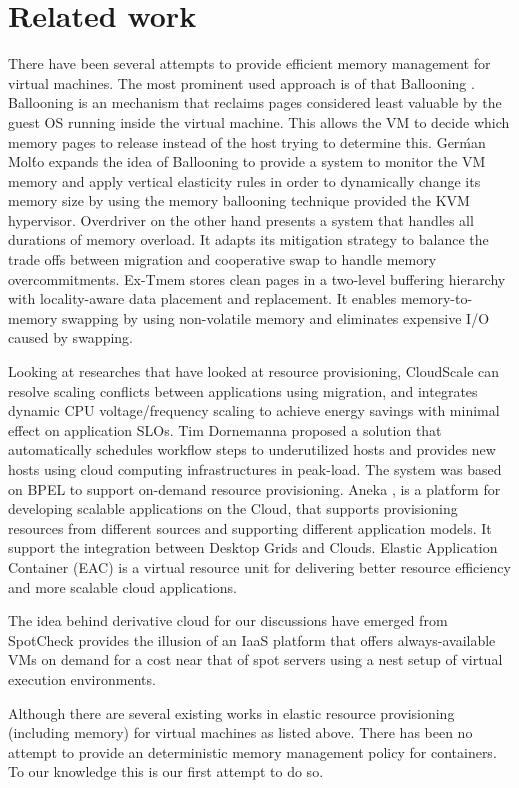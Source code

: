 
\chapter{Related work}
  
  There have been several attempts to provide efficient memory management for virtual machines. The most prominent used approach is of 
that Ballooning \cite{waldspurger2002memory}. Ballooning is an mechanism that reclaims pages considered least valuable by the guest OS 
running inside the virtual machine. This allows the VM to decide which memory pages to release instead of the host trying to determine this.
Gerḿan Molt́o \cite{molto2013elastic} expands the idea of Ballooning to provide a system to monitor the VM memory and apply vertical 
elasticity rules in order to dynamically change its memory size by using the memory ballooning technique provided the KVM hypervisor. 
Overdriver \cite{williams2011overdriver} on the other hand presents a system that handles all durations of memory overload. It adapts its 
mitigation strategy to balance the trade offs between migration and cooperative swap to handle memory overcommitments. Ex-Tmem 
\cite{venkatesan2014ex} stores clean pages in a two-level buffering hierarchy with locality-aware data placement and replacement. It 
enables memory-to-memory swapping by using non-volatile memory and eliminates expensive I/O caused by swapping.
  
  Looking at researches that have looked at resource provisioning, CloudScale \cite{shen2011cloudscale} can resolve scaling conflicts 
between applications using migration, and integrates dynamic CPU voltage/frequency scaling to achieve energy savings with minimal effect on 
application SLOs. Tim Dornemanna\cite{dornemann2009demand} proposed a solution that automatically schedules workflow steps to underutilized 
hosts and provides new hosts using cloud computing infrastructures in peak-load. The system was based on BPEL to support on-demand resource 
provisioning. Aneka \cite{calheiros2012aneka}, is a platform for developing scalable applications on the Cloud, that supports provisioning 
resources from different sources and supporting different application models. It support the integration between Desktop Grids and Clouds. 
Elastic Application Container (EAC) \cite{he2012elastic} is a virtual resource unit for delivering better resource efficiency and more 
scalable cloud applications. 

  The idea behind derivative cloud for our discussions have emerged from SpotCheck \cite{sharma2015spotcheck}  provides the illusion of an 
IaaS platform that offers always-available VMs on demand for a cost near that of spot servers using a nest setup of virtual execution 
environments. 

  Although there are several existing works in elastic resource provisioning (including memory) for virtual machines as listed above. There 
has been no attempt to provide an deterministic memory management policy for containers. To our knowledge this is our first attempt to do 
so. 
